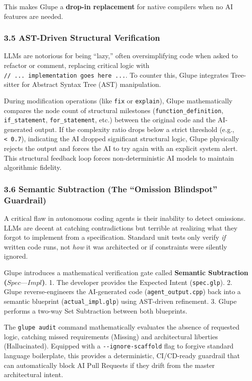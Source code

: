 \documentclass[11pt, a4paper]{article}
\begin{document}
This makes Glupe a \textbf{drop-in replacement} for native compilers
when no AI features are needed.

\subsubsection{3.5 AST-Driven Structural
Verification}\label{ast-driven-structural-verification}

LLMs are notorious for being ``lazy,'' often oversimplifying code when
asked to refactor or comment, replacing critical logic with
\texttt{//\ ...\ implementation\ goes\ here\ ...}. To counter this,
Glupe integrates Tree-sitter for Abstract Syntax Tree (AST)
manipulation.

During modification operations (like \texttt{fix} or \texttt{explain}),
Glupe mathematically compares the node count of structural milestones
(\texttt{function\_definition}, \texttt{if\_statement},
\texttt{for\_statement}, etc.) between the original code and the
AI-generated output. If the complexity ratio drops below a strict
threshold (e.g., \texttt{\textless{}\ 0.7}), indicating the AI dropped
significant structural logic, Glupe physically rejects the output and
forces the AI to try again with an explicit system alert. This
structural feedback loop forces non-deterministic AI models to maintain
algorithmic fidelity.

\subsubsection{3.6 Semantic Subtraction (The ``Omission Blindspot''
Guardrail)}\label{semantic-subtraction-the-omission-blindspot-guardrail}

A critical flaw in autonomous coding agents is their inability to detect
omissions. LLMs are decent at catching contradictions but terrible at
realizing what they forgot to implement from a specification. Standard
unit tests only verify \emph{if} written code runs, not \emph{how} it
was architected or if constraints were silently ignored.

Glupe introduces a mathematical verification gate called
\textbf{Semantic Subtraction (\(Spec — Impl\))}. 1. The developer
provides the Expected Intent (\texttt{spec.glp}). 2. Glupe
reverse-engineers the AI-generated code (\texttt{agent\_output.cpp})
back into a semantic blueprint (\texttt{actual\_impl.glp}) using
AST-driven refinement. 3. Glupe performs a two-way Set Subtraction
between both blueprints.

The \texttt{glupe\ audit} command mathematically evaluates the absence
of requested logic, catching missed requirements (Missing) and
architectural liberties (Hallucinated). Equipped with a
\texttt{-\/-ignore-scaffold} flag to forgive standard language
boilerplate, this provides a deterministic, CI/CD-ready guardrail that
can automatically block AI Pull Requests if they drift from the master
architectural intent.
\end{document}
